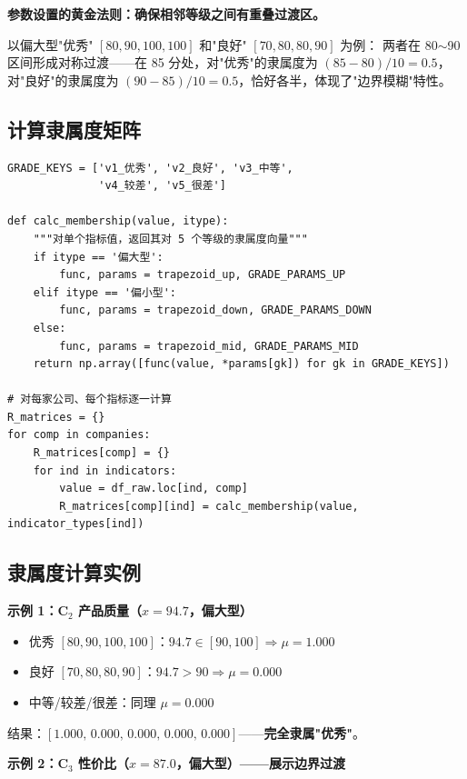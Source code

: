 \documentclass[a4paper,11pt]{ctexart}
\begin{document}
\begin{keybox}
\textbf{参数设置的黄金法则：确保相邻等级之间有重叠过渡区。}

以偏大型"优秀" $[80,90,100,100]$ 和"良好" $[70,80,80,90]$ 为例：
两者在 80$\sim$90 区间形成对称过渡——在 85 分处，对"优秀"的隶属度为 $(85-80)/10 = 0.5$，
对"良好"的隶属度为 $(90-85)/10 = 0.5$，恰好各半，体现了"边界模糊"特性。
\end{keybox}

\subsection{计算隶属度矩阵}

\begin{lstlisting}
GRADE_KEYS = ['v1_优秀', 'v2_良好', 'v3_中等',
              'v4_较差', 'v5_很差']

def calc_membership(value, itype):
    """对单个指标值，返回其对 5 个等级的隶属度向量"""
    if itype == '偏大型':
        func, params = trapezoid_up, GRADE_PARAMS_UP
    elif itype == '偏小型':
        func, params = trapezoid_down, GRADE_PARAMS_DOWN
    else:
        func, params = trapezoid_mid, GRADE_PARAMS_MID
    return np.array([func(value, *params[gk]) for gk in GRADE_KEYS])

# 对每家公司、每个指标逐一计算
R_matrices = {}
for comp in companies:
    R_matrices[comp] = {}
    for ind in indicators:
        value = df_raw.loc[ind, comp]
        R_matrices[comp][ind] = calc_membership(value, indicator_types[ind])
\end{lstlisting}

\subsection{隶属度计算实例}

\textbf{示例 1：C$_2$ 产品质量（$x=94.7$，偏大型）}

\begin{itemize}
    \item 优秀 $[80,90,100,100]$：$94.7 \in [90,100] \Rightarrow \mu = \mathbf{1.000}$
    \item 良好 $[70,80,80,90]$：$94.7 > 90 \Rightarrow \mu = 0.000$
    \item 中等/较差/很差：同理 $\mu = 0.000$
\end{itemize}

结果：$[1.000,\, 0.000,\, 0.000,\, 0.000,\, 0.000]$——\textbf{完全隶属"优秀"}。

\textbf{示例 2：C$_3$ 性价比（$x=87.0$，偏大型）——展示边界过渡}
\end{document}
